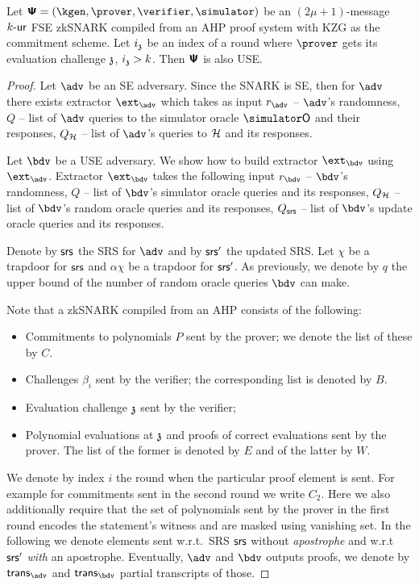 \documentclass[runningheads,11pt]{llncs}
\begin{document}
\begin{theorem}
  Let $\proofsystem = (\kgen, \prover, \verifier, \simulator)$ be an $(2\mu + 1)$-message ${k\text{-}\mathsf{ur}}$ FSE zkSNARK
  compiled from an AHP proof system with KZG as the commitment
  scheme. Let $i_{\mathfrak{z}}$ be an index of a round where $\prover$ gets its
  evaluation challenge $\mathfrak{z}$, $i_{\mathfrak{z}} > k$. Then $\bm{\mathsf{\Psi}}$ is
  also USE.
\end{theorem}
\begin{proof}
  Let $\adv$ be an SE adversary. Since the SNARK is SE, then for
  $\adv$ there exists extractor $\ext_\adv$ which takes as input
  $r_\adv$ -- $\adv$'s randomness, $Q$ -- list of $\adv$ queries to
  the simulator oracle $\simO$ and their responses, $Q_{\mathcal{H}}$ -- list
  of $\adv$'s queries to $\mathcal{H}$ and its responses.

  Let $\bdv$ be a USE adversary. We show how to build extractor
  $\ext_\bdv$ using $\ext_\adv$. Extractor $\ext_\bdv$ takes the following input $r_\bdv$ -- $\bdv$'s randomness, $Q$ -- list of $\bdv$'s simulator oracle queries and its responses, $Q_{\mathcal{H}}$ -- list of $\bdv$'s random oracle queries and its responses, $Q_{\mathsf{srs}}$ -- list of $\bdv$'s update oracle queries and its responses. 

  Denote by $\mathsf{srs}$ the SRS for $\adv$ and by $\mathsf{srs}'$ the updated
  SRS. Let $\chi$ be a trapdoor for $\mathsf{srs}$ and $\alpha \chi$ be a
  trapdoor for $\mathsf{srs}'$. As previously, we denote by $q$ the upper bound of the number of random oracle queries $\bdv$ can make.

  Note that a zkSNARK compiled from an AHP consists of the following:
  \begin{itemize}
  \item Commitments to polynomials $P$ sent by the prover; we denote the list of these by $C$.
  \item Challenges $\beta_i$ sent by the verifier; the corresponding list is denoted by $B$.
  \item Evaluation challenge $\mathfrak{z}$ sent by the verifier;
  \item Polynomial evaluations at $\mathfrak{z}$ and proofs of correct evaluations sent by the prover. The list of the former is denoted by $E$ and of the latter by $W$.
  \end{itemize}
  We denote by index $i$ the round when the particular proof element is sent. For example for commitments sent in the second round we write $C_2$.
  Here we also additionally require that the set of polynomials sent by the prover in the first round encodes the statement's witness and are masked using vanishing set.  
  In the following we denote elements sent w.r.t.~SRS $\mathsf{srs}$ without \emph{apostrophe} and w.r.t~$\mathsf{srs}'$ \emph{with} an apostrophe.
  Eventually, $\adv$ and $\bdv$ outputs proofs, we denote by $\tra$ and $\trb$ partial transcripts of those.


\end{proof}
\end{document}
